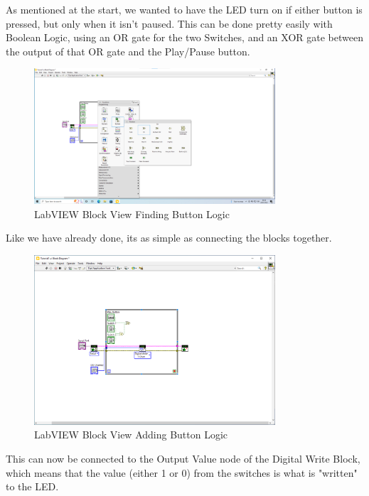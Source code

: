 \documentclass[a4paper,11pt]{report}
\begin{document}
As mentioned at the start, we wanted to have the LED turn on if either button is pressed, but only when it isn't paused. This can be done pretty easily with Boolean Logic, using an OR gate for the two Switches, and an XOR gate between the output of that OR gate and the Play/Pause button.

\begin{figure}[H]
\centering
\includegraphics[width=0.8\textwidth]{screenshots/labview24}
\caption{LabVIEW Block View Finding Button Logic}
\end{figure}

Like we have already done, its as simple as connecting the blocks together.

\begin{figure}[H]
\centering
\includegraphics[width=0.8\textwidth]{screenshots/labview25}
\caption{LabVIEW Block View Adding Button Logic}
\end{figure}

This can now be connected to the Output Value node of the Digital Write Block, which means that the value (either 1 or 0) from the switches is what is "written" to the LED.
\end{document}

